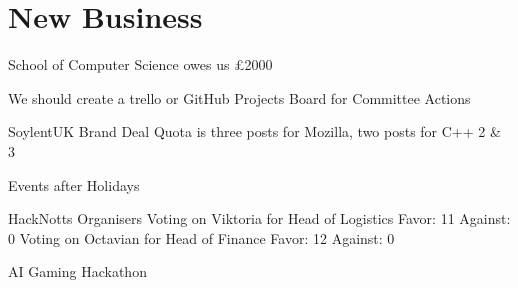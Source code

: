 \documentclass[11pt,hacksoc]{meetingmins}
\begin{document}
\section{New Business}
\begin{items}
\item School of Computer Science owes us \pounds2000
\item We should create a trello or GitHub Projects Board for Committee Actions
\item SoylentUK Brand Deal
  \subitem Quota is three posts for Mozilla, two posts for C++ 2 \& 3
\item Events after Holidays
\item HackNotts Organisers
  \subitem Voting on Viktoria for Head of Logistics
    \subsubitem Favor: 11
    \subsubitem Against: 0
  \subitem Voting on Octavian for Head of Finance
    \subsubitem Favor: 12
    \subsubitem Against: 0
\item AI Gaming Hackathon
\end{items}

\vspace{1em}
\nextmeeting{}
\end{document}
